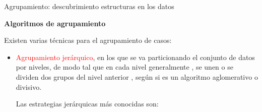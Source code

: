\documentclass[11pt]{beamer}
\begin{document}
\begin{frame}{Agrupamiento: descubrimiento estructuras en los datos}
	
	\textbf{Algoritmos de agrupamiento}
	
	\vspace{0.2cm}
	
	
	\scriptsize{ Existen varias t\'ecnicas para el agrupamiento de casos:
\begin{itemize}		
\item \textcolor{red}{Agrupamiento jer\'arquico}, en los  que se va particionando el conjunto  de  datos  por  niveles, de modo tal que  en  cada  nivel  generalmente , se  unen o se  dividen dos grupos del  nivel anterior ,  seg\'un  si  es  un  algoritmo  aglomerativo  o  divisivo.

\vspace{0.2cm}

Las estrategias jer\'arquicas m\'as conocidas son:


\end{itemize}		
}

\end{frame}
\end{document}
